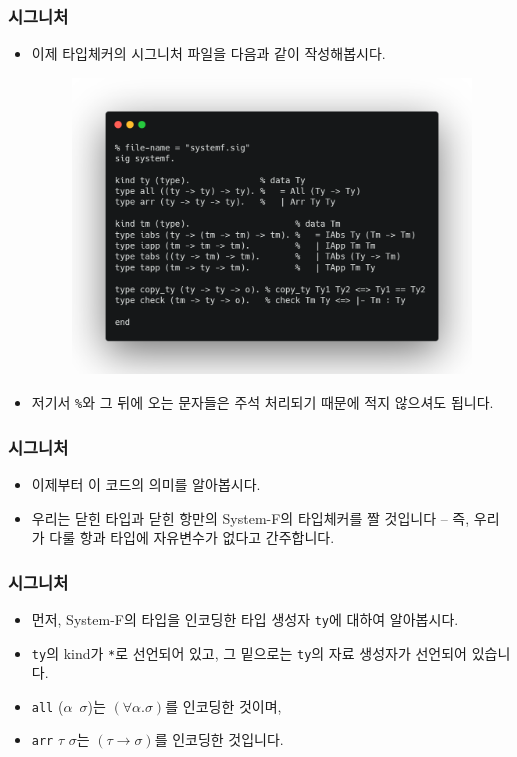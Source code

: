\documentclass[slidestop,compress,mathserif]{beamer}
\begin{document}
    \begin{frame}
        \frametitle{시그니처}
        \begin{itemize}
            \item 이제 타입체커의 시그니처 파일을 다음과 같이 작성해봅시다.
            \begin{figure}[h]
                \begin{center}
                    \includegraphics[width=0.7\linewidth]{sig.png}
                \end{center}
            \end{figure}
            \item 저기서 \texttt{\%}와 그 뒤에 오는 문자들은 주석 처리되기 때문에 적지 않으셔도 됩니다.
        \end{itemize}
    \end{frame}

    \begin{frame}
        \frametitle{시그니처}
        \begin{itemize}
            \item 이제부터 이 코드의 의미를 알아봅시다.
            \item 우리는 닫힌 타입과 닫힌 항만의 System-F의 타입체커를 짤 것입니다 -- 즉, 우리가 다룰 항과 타입에 자유변수가 없다고 간주합니다.
        \end{itemize}
    \end{frame}

    \begin{frame}
        \frametitle{시그니처}
        \begin{itemize}
            \item 먼저, System-F의 타입을 인코딩한 타입 생성자 \texttt{ty}에 대하여 알아봅시다.
            \item \texttt{ty}의 kind가 \texttt{*}로 선언되어 있고, 그 밑으로는 \texttt{ty}의 자료 생성자가 선언되어 있습니다.
            \item \texttt{all} ($\alpha$\texttt{\string\ }$\sigma$)는 $\left( \forall \alpha . \sigma \right)$를 인코딩한 것이며,
            \item \texttt{arr} $\tau$ $\sigma$는 $\left( \tau \to \sigma \right)$를 인코딩한 것입니다.
        \end{itemize}
    \end{frame}
\end{document}
